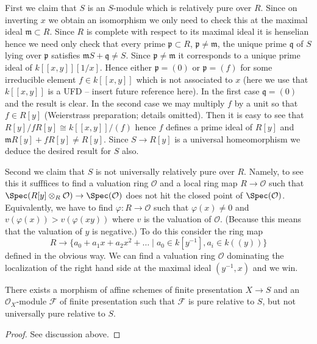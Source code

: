 \medskip\noindent
First we claim that $S$ is an $S$-module which is relatively pure
over $R$. Since on inverting $x$ we obtain an isomorphism we only need
to check this at the maximal ideal $\mathfrak m \subset R$. Since
$R$ is complete with respect to its maximal ideal it is henselian
hence we need only check that every prime $\mathfrak p \subset R$,
$\mathfrak p \not = \mathfrak m$, the unique prime $\mathfrak q$
of $S$ lying over $\mathfrak p$ satisfies
$\mathfrak mS + \mathfrak q \not = S$. Since $\mathfrak p \not = \mathfrak m$
it corresponds to a unique prime ideal of $k[[x, y]][1/x]$. Hence
either $\mathfrak p = (0)$ or $\mathfrak p = (f)$ for some
irreducible element $f \in k[[x, y]]$ which is not associated to $x$
(here we use that $k[[x, y]]$ is a UFD -- insert future reference here).
In the first case $\mathfrak q = (0)$ and the result is clear. In the
second case we may multiply $f$ by a unit so that $f \in R[y]$
(Weierstrass preparation; details omitted). Then it is easy to see that
$R[y]/fR[y] \cong k[[x, y]]/(f)$ hence $f$ defines a prime ideal
of $R[y]$ and $\mathfrak mR[y] + fR[y] \not = R[y]$.
Since $S \to R[y]$ is a universal homeomorphism we deduce the
desired result for $S$ also.

\medskip\noindent
Second we claim that $S$ is not universally relatively pure over $R$.
Namely, to see this it sufffices to find a valuation ring
$\mathcal{O}$ and a local ring map $R \to \mathcal{O}$ such that
$\Spec(R[y] \otimes_R \mathcal{O}) \to \Spec(\mathcal{O})$
does not hit the closed point of $\Spec(\mathcal{O})$.
Equivalently, we have to find $\varphi : R \to \mathcal{O}$ such that
$\varphi(x) \not = 0$ and $v(\varphi(x)) > v(\varphi(xy))$ where $v$
is the valuation of $\mathcal{O}$.
(Because this means that the valuation of $y$ is negative.)
To do this consider the ring map
$$
R
\longrightarrow
\{a_0 + a_1 x + a_2 x^2 + \ldots \mid a_0 \in k[y^{-1}], a_i \in k((y))\}
$$
defined in the obvious way. We can find a valuation ring $\mathcal{O}$
dominating the localization of the right hand side at the maximal
ideal $(y^{-1}, x)$ and we win.

\begin{lemma}
\label{lemma-pure-not-universally-pure}
There exists a morphism of affine schemes of finite presentation
$X \to S$ and an $\mathcal{O}_X$-module $\mathcal{F}$ of finite presentation
such that $\mathcal{F}$ is pure relative to $S$, but not universally
pure relative to $S$.
\end{lemma}

\begin{proof}
See discussion above.
\end{proof}



